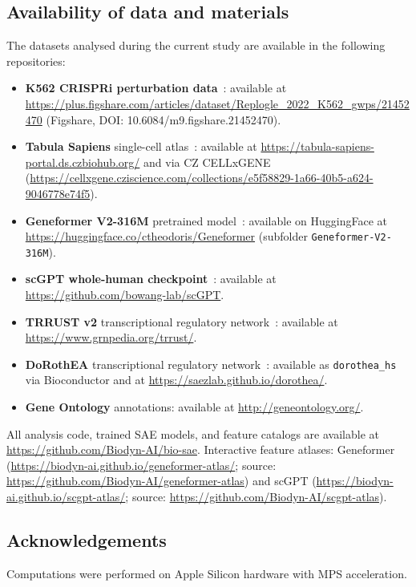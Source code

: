 \documentclass[onecolumn]{article}
\begin{document}
\subsection*{Availability of data and materials}
The datasets analysed during the current study are available in the following repositories:
\begin{itemize}
\item \textbf{K562 CRISPRi perturbation data}~\cite{replogle2022mapping}: available at \url{https://plus.figshare.com/articles/dataset/Replogle_2022_K562_gwps/21452470} (Figshare, DOI: 10.6084/m9.figshare.21452470).
\item \textbf{Tabula Sapiens} single-cell atlas~\cite{tabula2022tabula}: available at \url{https://tabula-sapiens-portal.ds.czbiohub.org/} and via CZ CELLxGENE (\url{https://cellxgene.cziscience.com/collections/e5f58829-1a66-40b5-a624-9046778e74f5}).
\item \textbf{Geneformer V2-316M} pretrained model~\cite{theodoris2023transfer}: available on HuggingFace at \url{https://huggingface.co/ctheodoris/Geneformer} (subfolder \texttt{Geneformer-V2-316M}).
\item \textbf{scGPT whole-human checkpoint}~\cite{cui2024scgpt}: available at \url{https://github.com/bowang-lab/scGPT}.
\item \textbf{TRRUST v2} transcriptional regulatory network~\cite{han2018trrust}: available at \url{https://www.grnpedia.org/trrust/}.
\item \textbf{DoRothEA} transcriptional regulatory network~\cite{garcia-alonso2019dorothea}: available as \texttt{dorothea\_hs} via Bioconductor and at \url{https://saezlab.github.io/dorothea/}.
\item \textbf{Gene Ontology} annotations: available at \url{http://geneontology.org/}.
\end{itemize}
All analysis code, trained SAE models, and feature catalogs are available at \url{https://github.com/Biodyn-AI/bio-sae}. Interactive feature atlases: Geneformer (\url{https://biodyn-ai.github.io/geneformer-atlas/}; source: \url{https://github.com/Biodyn-AI/geneformer-atlas}) and scGPT (\url{https://biodyn-ai.github.io/scgpt-atlas/}; source: \url{https://github.com/Biodyn-AI/scgpt-atlas}).

\subsection*{Acknowledgements}
Computations were performed on Apple Silicon hardware with MPS acceleration.



\end{document}
